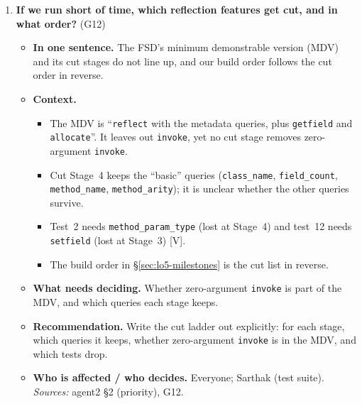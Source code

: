 \documentclass[10pt]{article}
\newcommand{\code}[1]{\texttt{\small #1}}
\newcommand{\mV}{\textsf{\scriptsize[V]}}
\newcommand{\field}[1]{\textbf{#1}\enspace}
\newcommand{\decitem}[1]{\needspace{6\baselineskip}\setcounter{enumi}{\numexpr#1-1\relax}\item}
\begin{document}
\begin{enumerate}[label=\textbf{\arabic*.},ref=\arabic*,leftmargin=1.8em,itemsep=0.8em]
\decitem{12}\label{dec:cuts}\textbf{If we run short of time, which reflection features get cut, and in what order?} (G12)
\begin{itemize}
\item[] \field{In one sentence.} The FSD's minimum demonstrable version (MDV) and its cut stages do not line up, and our build order follows the cut order in reverse.
\item[] \field{Context.}
\begin{itemize}
\item The MDV is ``\code{reflect} with the metadata queries, plus \code{getfield} and \code{allocate}''. It leaves out \code{invoke}, yet no cut stage removes zero-argument \code{invoke}.
\item Cut Stage~4 keeps the ``basic'' queries (\code{class\_name}, \code{field\_count}, \code{method\_name}, \code{method\_arity}); it is unclear whether the other queries survive.
\item Test~2 needs \code{method\_param\_type} (lost at Stage~4) and test~12 needs \code{setfield} (lost at Stage~3) \mV.
\item The build order in \S\ref{sec:lo5-milestones} is the cut list in reverse.
\end{itemize}
\item[] \field{What needs deciding.} Whether zero-argument \code{invoke} is part of the MDV, and which queries each stage keeps.
\item[] \field{Recommendation.} Write the cut ladder out explicitly: for each stage, which queries it keeps, whether zero-argument \code{invoke} is in the MDV, and which tests drop.
\item[] \field{Who is affected / who decides.} Everyone; Sarthak (test suite). \emph{Sources:} agent2 §2 (priority), G12.
\end{itemize}


\end{enumerate}
\end{document}
